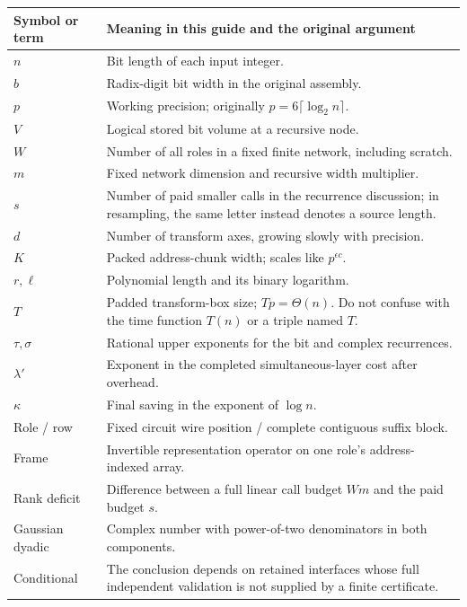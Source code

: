 
\begin{longtable}{@{}p{.18\linewidth}p{.76\linewidth}@{}}
\toprule Symbol or term & Meaning in this guide and the original argument \\
\midrule\endhead
$n$ & Bit length of each input integer. \\
$b$ & Radix-digit bit width in the original assembly. \\
$p$ & Working precision; originally $p=6\lceil\log_2 n\rceil$. \\
$V$ & Logical stored bit volume at a recursive node. \\
$W$ & Number of all roles in a fixed finite network, including scratch. \\
$m$ & Fixed network dimension and recursive width multiplier. \\
$s$ & Number of paid smaller calls in the recurrence discussion; in resampling, the same letter instead denotes a source length. \\
$d$ & Number of transform axes, growing slowly with precision. \\
$K$ & Packed address-chunk width; scales like $p^{\epsilon c}$. \\
$r,\ell$ & Polynomial length and its binary logarithm. \\
$T$ & Padded transform-box size; $Tp=\Theta(n)$. Do not confuse with the time function $T(n)$ or a triple named $T$. \\
$\tau,\sigma$ & Rational upper exponents for the bit and complex recurrences. \\
$\lambda'$ & Exponent in the completed simultaneous-layer cost after overhead. \\
$\kappa$ & Final saving in the exponent of $\log n$. \\
Role / row & Fixed circuit wire position / complete contiguous suffix block. \\
Frame & Invertible representation operator on one role's address-indexed array. \\
Rank deficit & Difference between a full linear call budget $Wm$ and the paid budget $s$. \\
Gaussian dyadic & Complex number with power-of-two denominators in both components. \\
Conditional & The conclusion depends on retained interfaces whose full independent validation is not supplied by a finite certificate. \\
\bottomrule
\end{longtable}

